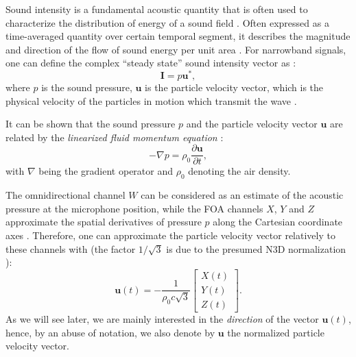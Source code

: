 Sound intensity is a fundamental acoustic quantity that is often used to characterize the distribution of energy of a sound field \cite{williams_fourier_2000}. Often expressed as a time-averaged quantity over certain temporal segment, it describes the magnitude and direction of the flow of sound energy per unit area \cite{jacobsen_fundamentals_2013}. For narrowband signals, one can define the complex ``steady state'' sound intensity vector as \cite{jacobsen_note_1991,williams_fourier_2000}:
\begin{equation}
\label{eq:intensityDefinition}
    \mathbf{I} = p \mathbf{u}^*,
\end{equation}
where $p$ is the sound pressure, $\mathbf{u}$ is the particle velocity vector, which is the physical velocity of the particles in motion which transmit the wave \cite{kinsler_fundamentals_2000}.

It can be shown that the sound pressure $p$ and the particle velocity vector $\mathbf{u}$ are related by the \textit{linearized fluid momentum equation} \cite[p.~27]{merimaa_analysis_2006}:
\begin{equation}
    - \nabla p = \rho_0 \frac{\partial \mathbf{u}}{\partial t},
\end{equation}
with $\nabla$ being the gradient operator and $\rho_0$ denoting the air density. 

The omnidirectional channel $W$ can be considered as an estimate of the acoustic pressure at the microphone position, while the FOA channels $X$, $Y$ and $Z$ approximate the spatial derivatives of pressure $p$ along the Cartesian coordinate axes \cite[p.~50]{merimaa_analysis_2006}. Therefore, one can approximate the particle velocity vector relatively to these channels with \cite[p.~90]{pulkki_parametric_2018} (the factor $1/\sqrt{3}$ is due to the presumed N3D normalization \cite{daniel_representation_2001}):
\begin{equation}
\label{eq:velocityVectorApprox}
\mathbf{u}(t) = - \frac{1}{\rho_0 c \sqrt{3}}
\begin{bmatrix} X(t) \\ Y(t) \\ Z(t) \end{bmatrix}.
\end{equation}
As we will see later, we are mainly interested in the \emph{direction} of the vector $\mathbf{u}(t)$, hence, by an abuse of notation, we also denote by $\mathbf{u}$ the normalized particle velocity vector. 

